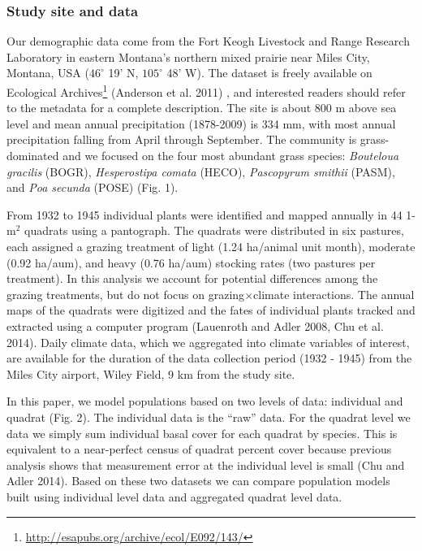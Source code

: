 \documentclass[12pt,]{article}
\begin{document}
\subsubsection{Study site and data}\label{study-site-and-data}

Our demographic data come from the Fort Keogh Livestock and Range
Research Laboratory in eastern Montana's northern mixed prairie near
Miles City, Montana, USA ($46^{\circ}$ 19' N, $105^{\circ}$ 48' W). The
dataset is freely available on Ecological Archives\footnote{\url{http://esapubs.org/archive/ecol/E092/143/}}
(Anderson et al. 2011) , and interested readers should refer to the
metadata for a complete description. The site is about 800 m above sea
level and mean annual precipitation (1878-2009) is 334 mm, with most
annual precipitation falling from April through September. The community
is grass-dominated and we focused on the four most abundant grass
species: \emph{Bouteloua gracilis} (BOGR), \emph{Hesperostipa comata}
(HECO), \emph{Pascopyrum smithii} (PASM), and \emph{Poa secunda} (POSE)
(Fig. 1).

From 1932 to 1945 individual plants were identified and mapped annually
in 44 1-$\text{m}^2$ quadrats using a pantograph. The quadrats were
distributed in six pastures, each assigned a grazing treatment of light
(1.24 ha/animal unit month), moderate (0.92 ha/aum), and heavy (0.76
ha/aum) stocking rates (two pastures per treatment). In this analysis we
account for potential differences among the grazing treatments, but do
not focus on grazing$\times$climate interactions. The annual maps of the
quadrats were digitized and the fates of individual plants tracked and
extracted using a computer program (Lauenroth and Adler 2008, Chu et al.
2014). Daily climate data, which we aggregated into climate variables of
interest, are available for the duration of the data collection period
(1932 - 1945) from the Miles City airport, Wiley Field, 9 km from the
study site.

In this paper, we model populations based on two levels of data:
individual and quadrat (Fig. 2). The individual data is the ``raw''
data. For the quadrat level we data we simply sum individual basal cover
for each quadrat by species. This is equivalent to a near-perfect census
of quadrat percent cover because previous analysis shows that
measurement error at the individual level is small (Chu and Adler 2014).
Based on these two datasets we can compare population models built using
individual level data and aggregated quadrat level data.
\end{document}
